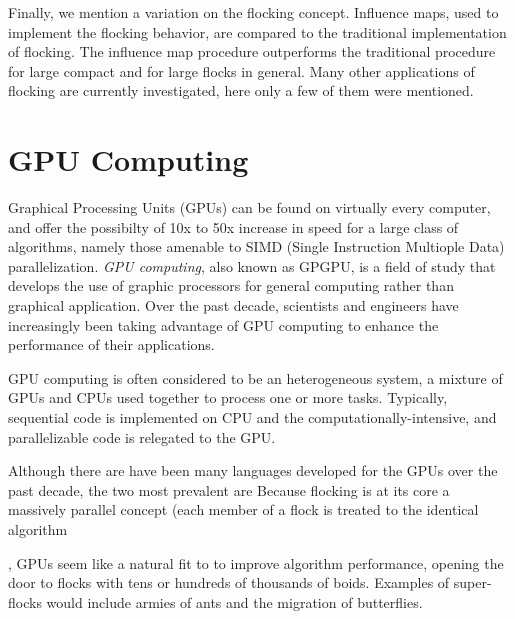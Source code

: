 {Finally, we mention a variation on the flocking concept.  
Influence maps, used to implement the flocking behavior, are compared to the 
traditional implementation of flocking\cite{flockingInfluenceMaps}. 
The influence map procedure outperforms the traditional procedure for large 
compact and for large flocks in general. Many other applications of flocking are currently investigated, here only a few of them were mentioned.

\section{GPU Computing}
Graphical Processing Units (GPUs) can be found on virtually every computer, and offer
the possibilty of 10x to 50x increase in speed for a large class of algorithms, namely 
those amenable to SIMD (Single Instruction Multiople Data)  parallelization. 
\textit{GPU computing}, also known as GPGPU, is a field of study that develops
the use of graphic processors for general computing rather than graphical application. 
Over the past decade, scientists and engineers have increasingly been taking 
advantage of GPU computing to enhance the performance of their applications.

GPU computing is often considered to be an heterogeneous system, a mixture of 
GPUs and CPUs used together to process one or more tasks. 
Typically, sequential code is implemented on CPU and the 
computationally-intensive, and parallelizable code is relegated to the GPU.

Although there are have been many languages developed for the GPUs over the past decade, 
the two most prevalent are 
Because flocking is at its core a massively parallel concept (each member of a flock is 
treated to the identical algorithm}, GPUs seem like a natural fit to 
to improve algorithm performance, opening the door to flocks with 
tens or hundreds of thousands of boids. Examples of super-flocks would include 
armies of ants and the migration of butterflies. 

